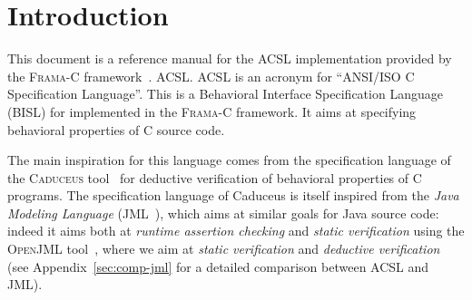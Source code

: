 \chapter{Introduction}

This document is a reference manual for
%
           {the ACSL implementation provided by the
             \mbox{\textsc{Frama-C}} %
            framework~\cite{frama-c}.}%
           {ACSL.}
ACSL is an acronym for ``ANSI/ISO C
Specification Language''. This is a Behavioral Interface Specification
Language (BISL)
%
           {for}%
           {implemented in the \textsc{Frama-C} framework. It aims at}
specifying behavioral properties of C
source code.

%

The main inspiration for this language comes from the
specification language of the \textsc{Caduceus}
tool~\cite{filliatre04icfem,filliatre07cav} for deductive verification
of behavioral properties of C programs. The specification language of
Caduceus is itself inspired from the
\emph{Java Modeling Language} (JML~\cite{leavens00jml}), which aims at
similar goals for Java source code: indeed it aims both at
\emph{runtime assertion checking} and \emph{static verification} using
the \textsc{OpenJML} tool~\cite{Cok-2011-OpenJML,Cok-2014-OpenJML}, where we aim at
\emph{static verification} and \emph{deductive verification} (see
Appendix~\ref{sec:comp-jml} for a detailed comparison between ACSL and
JML).


